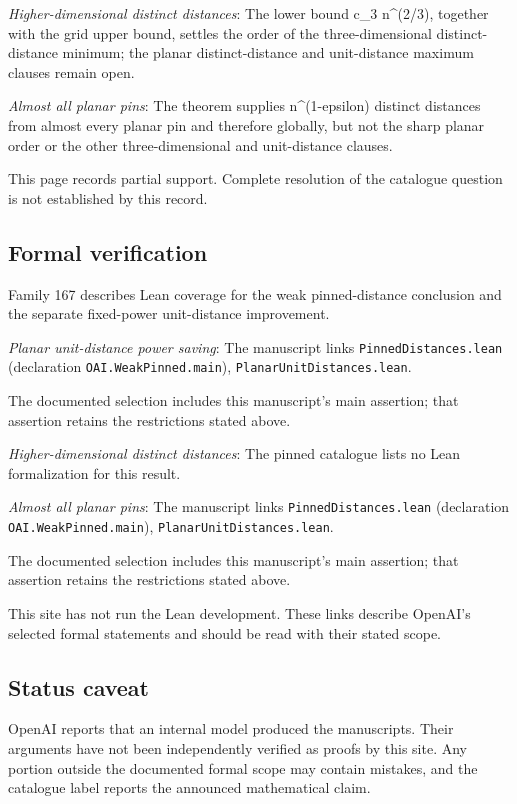 \documentclass[11pt]{article}
\begin{document}
\textit{Higher-dimensional distinct distances}: The lower bound c\_3 n\textasciicircum{}(2/3), together with the grid upper bound, settles the order of the three-dimensional distinct-distance minimum; the planar distinct-distance and unit-distance maximum clauses remain open.

\textit{Almost all planar pins}: The theorem supplies n\textasciicircum{}(1-epsilon) distinct distances from almost every planar pin and therefore globally, but not the sharp planar order or the other three-dimensional and unit-distance clauses.

This page records partial support. Complete resolution of the catalogue question is not established by this record.

\subsection{Formal verification}
Family 167 describes Lean coverage for the weak pinned-distance conclusion and the separate fixed-power unit-distance improvement.

\textit{Planar unit-distance power saving}: The manuscript links \texttt{PinnedDistances.lean} (declaration \texttt{OAI.WeakPinned.main}), \texttt{PlanarUnitDistances.lean}.

The documented selection includes this manuscript’s main assertion; that assertion retains the restrictions stated above.

\textit{Higher-dimensional distinct distances}: The pinned catalogue lists no Lean formalization for this result.

\textit{Almost all planar pins}: The manuscript links \texttt{PinnedDistances.lean} (declaration \texttt{OAI.WeakPinned.main}), \texttt{PlanarUnitDistances.lean}.

The documented selection includes this manuscript’s main assertion; that assertion retains the restrictions stated above.

This site has not run the Lean development. These links describe OpenAI’s selected formal statements and should be read with their stated scope.

\subsection{Status caveat}
OpenAI reports that an internal model produced the manuscripts. Their arguments have not been independently verified as proofs by this site. Any portion outside the documented formal scope may contain mistakes, and the catalogue label reports the announced mathematical claim.
\end{document}
